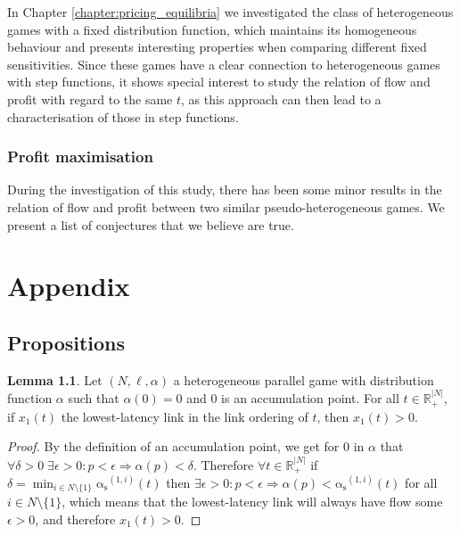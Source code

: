 \documentclass[10pt,a4paper]{book}
\newcommand{\as}{\mathrm{\alpha_s}}
\newcommand{\R}{\mathbb{R}}
\theoremstyle{definition}
\newtheorem{lemma}[definition]{Lemma}
\theoremstyle{comment}
\begin{document}
In Chapter \ref{chapter:pricing_equilibria} we investigated the class of heterogeneous games with a fixed distribution function, which maintains its homogeneous behaviour and presents interesting properties when comparing different fixed sensitivities.
Since these games have a clear connection to heterogeneous games with step functions, it shows special interest to study the relation of flow and profit with regard to the same $t$, as this approach can then lead to a characterisation of those in step functions.

\subsection*{Profit maximisation}

During the investigation of this study, there has been some minor results in the relation of flow and profit between two similar pseudo-heterogeneous games.
We present a list of conjectures that we believe are true.

\cleardoublepage

{}


\cleardoublepage

{}
\chapter{Appendix}
\label{chapter:appendix}

\section*{Propositions}

\begin{lemma}
	\label{lemma:a_0_accumulation_point}
	Let $(N, \ell, \alpha)$ a heterogeneous parallel game with distribution function $\alpha$ such that $\alpha(0) = 0$ and $0$ is an accumulation point.
	For all $t \in \R_+^{|N|}$, if $x_1(t)$ the lowest-latency link in the link ordering of $t$, then $x_1(t) > 0$.
\end{lemma}

\begin{proof}
	By the definition of an accumulation point, we get for $0$ in $\alpha$ that $\forall \delta > 0 \; \exists \epsilon > 0: p < \epsilon \Rightarrow \alpha(p) < \delta$.
	Therefore $\forall t \in \R_+^{|N|}$ if $\delta = \min_{i \in N \setminus \{1\}}\as^{(1, i)}(t)$ then $\exists \epsilon > 0: p < \epsilon \Rightarrow \alpha(p) < \as^{(1, i)}(t)$ for all $i \in N \setminus \{1\}$, which means that the lowest-latency link will always have flow some $\epsilon > 0$, and therefore $x_1(t) > 0$.
\end{proof}
\end{document}
